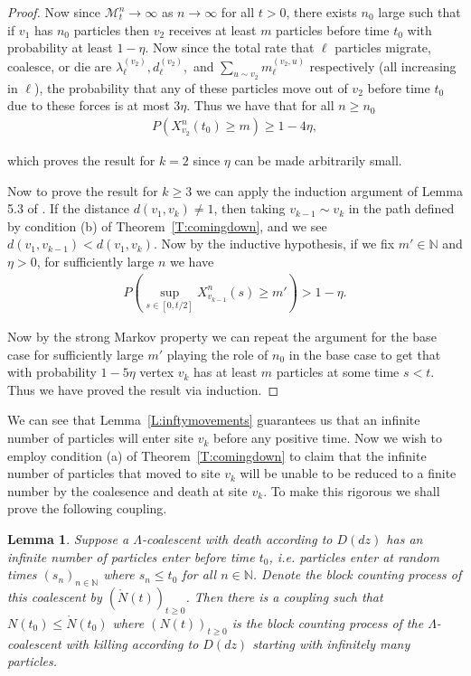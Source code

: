 \documentclass[11pt]{article}
\newtheorem{lemma}{Lemma}
\theoremstyle{definition}
\newcommand{\N}{\mathbb{N}}
\newcommand{\thmref}[1]{Theorem~\ref{T:#1}}
\newcommand{\lemref}[1]{Lemma~\ref{L:#1}}
\begin{document}
\begin{proof}
    \noindent Now since $\mathcal{M}^n_t \to \infty$ as $n \to \infty$ for all $t > 0$, there exists $n_0$ large such that if $v_1$ has $n_0$ particles then $v_2$ receives at least $m$ particles before time $t_0$ with probability at least $1-\eta$. Now since the total rate that $\ell$ particles migrate, coalesce, or die are $\lambda_\ell^{(v_2)}, d_\ell^{(v_2)},$ and $\sum_{u \sim v_2} m_\ell^{(v_2,u)}$ respectively (all increasing in $\ell$), the probability that any of these particles move out of $v_2$ before time $t_0$ due to these forces is at most $3\eta$. Thus we have that for all $n \geq n_0$
    \begin{align*}
        P\left( X_{v_2}^n(t_0) \geq m\right) \geq 1 - 4\eta,
    \end{align*}

    \noindent which proves the result for $k = 2$ since $\eta$ can be made arbitrarily small.
    \medskip

    \noindent Now to prove the result for $k \geq 3$ we can apply the induction argument of Lemma 5.3 of \cite{Angel2012}. If the distance $d(v_1, v_k) \neq 1$, then taking $v_{k-1} \sim v_k$ in the path defined by condition (b) of \thmref{comingdown}, and we see $d(v_1, v_{k-1}) < d(v_1, v_k)$. Now by the inductive hypothesis, if we fix $m' \in \N$ and $\eta >0$, for sufficiently large $n$ we have
    \begin{align*}
        P\left(\sup_{s \in [0,t/2]} X_{v_{k-1}}^n(s) \geq m'\right) > 1 - \eta.
    \end{align*}

    \noindent Now by the strong Markov property we can repeat the argument for the base case for sufficiently large $m'$ playing the role of $n_0$ in the base case to get that with probability $1- 5\eta$ vertex $v_k$ has at least $m$ particles at some time $s < t$. Thus we have proved the result via induction.
\end{proof}

\noindent We can see that \lemref{inftymovements} guarantees us that an infinite number of particles will enter site $v_k$ before any positive time. Now we wish to employ condition (a) of \thmref{comingdown} to claim that the infinite number of particles that moved to site $v_k$ will be unable to be reduced to a finite number by the coalesence and death at site $v_k$. To make this rigorous we shall prove the following coupling.

\begin{lemma}\label{L:killingcouple}
    Suppose a $\Lambda$-coalescent with death according to $D(dz)$ has an infinite number of particles enter before time $t_0$, i.e. particles enter at random times $(s_n)_{n \in \N}$ where $s_n \leq t_0$ for all $n \in \N$. Denote the block counting process of this coalescent by $(\mathring{N}(t))_{t \geq 0}$. Then there is a coupling such that $N(t_0) \leq \mathring{N}(t_0)$ where $(N(t))_{t\geq 0}$ is the block counting process of the $\Lambda$-coalescent with killing according to $D(dz)$ starting with infinitely many particles.
\end{lemma}
\end{document}
